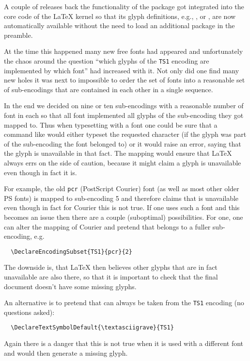 \documentclass{ltnews}
\begin{document}
A couple of releases back the functionality of the 
package got integrated into the core code of the \LaTeX{} kernel so
that its glyph definitions, e.g., ,  or
, are now automatically available without the need to load
an additional package in the preamble.

At the time this happened many new free fonts had appeared and
unfortunately the chaos around the question \enquote{which glyphs of
  the \texttt{TS1} encoding are implemented by which font} had
increased with it. Not only did one find many new holes it was next to
impossible to order the set of fonts into a reasonable set of
sub-encodings that are contained in each other in a single sequence.

In the end we decided on nine or ten sub-encodings with a reasonable
number of font in each so that all font implemented all glyphs of the
sub-encoding they got mapped to. Thus when typesetting with a font one
could be sure that a command like  would either
typeset the requested character (if the glyph was part of the
sub-encoding the font belonged to) or it would raise an error, saying
that the glyph is unavailable in that fact. The mapping would ensure
that \LaTeX{} always errs on the side of caution, because it might
claim a glyph is unavailable even though in fact it is.

For example, the old \texttt{pcr} (PostScript Courier) font (as well
as most other older PS fonts) is mapped to sub-encoding 5 and
therefore claims that  is unavailable even though
in fact for Courier this is not true. If one uses such a font and this
becomes an issue then there are a couple (suboptimal) possibilities.
For one, one can alter the mapping of Courier and pretend that belongs
to a fuller sub-encoding, e.g.
\begin{verbatim}
  \DeclareEncodingSubset{TS1}{pcr}{2}
\end{verbatim}
The downside is, that \LaTeX{} then believes other glyphs that are in fact
unavailable are also there, so that it is important to check that the
final document doesn't have some missing glyphs.

An alternative is to pretend that  can always be
taken from the \texttt{TS1} encoding (no questions asked):
\begin{verbatim}
  \DeclareTextSymbolDefault{\textasciigrave}{TS1}
\end{verbatim}
Again there is a danger that this is not true when it is used with a
different font and would then generate a missing glyph.
\end{document}
